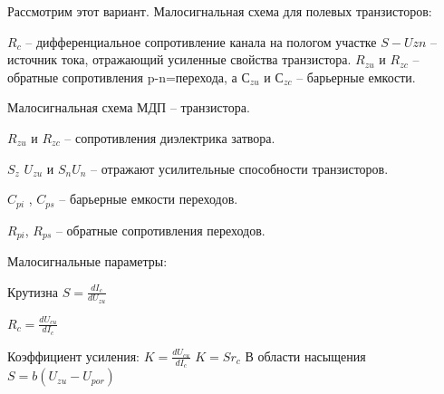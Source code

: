 Рассмотрим этот вариант.
Малосигнальная схема для полевых транзисторов:
\begin{center}
\begin{figure}[h!]
		\label{}
	\end{figure}
\end{center}
$R_c$ – дифференциальное сопротивление канала на пологом участке
$S - U{zn}$ – источник тока, отражающий усиленные свойства транзистора.
$R_{zu}$ и $R_{zc}$ – обратные сопротивления p-n=перехода, а $С_{zu}$ и $С_{zc}$ – барьерные емкости.

Малосигнальная схема МДП – транзистора.
\begin{center}
\begin{figure}[h!]
		\label{}
	\end{figure}
\end{center}
$R_{zu}$ и $R_{zc}$ – сопротивления диэлектрика затвора.

$S_{z}$ $U_{zu}$ и $S_n U_n$ – отражают усилительные способности транзисторов.
\pagebreak
\begin{center}
\begin{figure}[h!]
		\label{}
	\end{figure}
\end{center}
$C_{pi}$ , $C_{ps}$ – барьерные емкости переходов.

$R_{pi}$, $R_{ps}$ – обратные сопротивления переходов.

Малосигнальные параметры:

Крутизна $S=\frac{dI_c}{dU_{zu}}$

$R_c = \frac{dU_{cu}}{dI_c}$

Коэффициент усиления: $K=\frac{ dU_{cu} }{dI_c}$
$K=Sr_c$
В области насыщения $S=b(U_{zu} - U_{por})$

